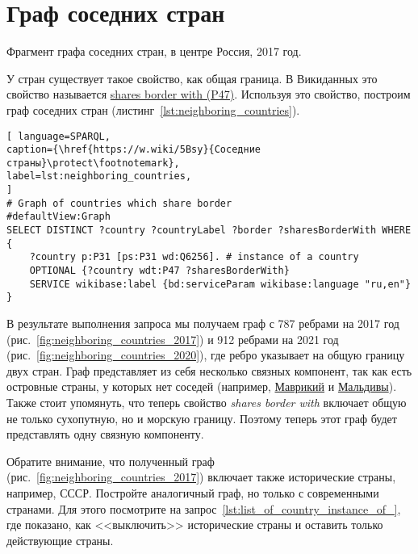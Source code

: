 \newpage
\section{Граф соседних стран}
%
\begin{marginfigure}%
	{
		\setlength{\fboxsep}{0pt}%
		\setlength{\fboxrule}{1pt}%
	}
    \caption[Фрагмент графа соседних стран, 2017 год.]{Фрагмент графа соседних стран, в центре Россия, 2017 год.}
	\label{fig:neighboring_countries_2017}%
\end{marginfigure}


У стран существует такое свойство, как общая граница. 
В Викиданных это свойство называется 
\href{https://www.wikidata.org/wiki/Property:P47}{shares border with (P47)}. 
Используя это свойство, построим граф соседних стран (листинг~\ref{lst:neighboring_countries}).

\begin{lstlisting}[ language=SPARQL, 
caption={\href{https://w.wiki/5Bsy}{Соседние страны}\protect\footnotemark},
label=lst:neighboring_countries, 
]
# Graph of countries which share border
#defaultView:Graph
SELECT DISTINCT ?country ?countryLabel ?border ?sharesBorderWith WHERE
{
    ?country p:P31 [ps:P31 wd:Q6256]. # instance of a country
    OPTIONAL {?country wdt:P47 ?sharesBorderWith}
    SERVICE wikibase:label {bd:serviceParam wikibase:language "ru,en"}
}
\end{lstlisting}

В результате выполнения запроса мы получаем граф с 787 ребрами на 2017 год 
(рис.~\ref{fig:neighboring_countries_2017}) 
и 912 ребрами на 2021 год (рис.~\ref{fig:neighboring_countries_2020}), 
где ребро указывает на общую границу двух стран. 
Граф представляет из себя несколько связных компонент, 
так как есть островные страны, у которых нет соседей 
(например, \href{https://w.wiki/vC7}{Маврикий} и \href{https://w.wiki/vC8}{Мальдивы}). 
Также стоит упомянуть, что теперь свойство {\textit{shares border with}} 
включает общую не только сухопутную, но и морскую границу. 
Поэтому теперь этот граф будет представлять одну связную компоненту. 

Обратите внимание, что полученный граф (рис.~\ref{fig:neighboring_countries_2017}) 
включает также исторические страны, например, СССР. 
Постройте аналогичный граф, но только с современными странами. 
Для этого посмотрите на запрос~\ref{lst:list_of_country_instance_of_}, где показано, 
как <<выключить>> исторические страны и оставить только действующие страны. 

